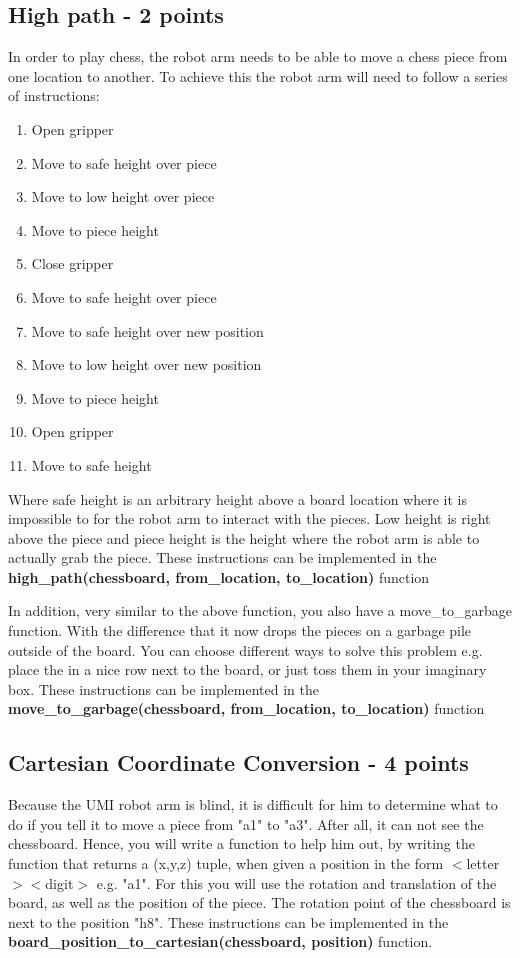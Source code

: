 \documentclass[10pt]{scrartcl}
\begin{document}
\subsection*{High path - 2 points}
In order to play chess, the robot arm needs to be able to move a chess piece from one location to another. To achieve this the robot arm will need to follow a series of instructions:
\begin{enumerate}
\item Open gripper
\item Move to safe height over piece
\item Move to low height over piece
\item Move to piece height
\item Close gripper
\item Move to safe height over piece
\item Move to safe height over new position
\item Move to low height over new position
\item Move to piece height
\item Open gripper
\item Move to safe height
\end{enumerate}
Where safe height is an arbitrary height above a board location where it is impossible to for the robot arm to interact with the pieces. Low height is right above the piece and piece height is the height where the robot arm is able to actually grab the piece. These instructions can be implemented in the \textbf{high\_path(chessboard, from\_location, to\_location)} function

In addition, very similar to the above function, you also have a move\_to\_garbage function. With the difference that it now drops the pieces on a garbage pile outside of the board. You can choose different ways to solve this problem e.g. place the in a nice row next to the board, or just toss them in your imaginary box. These instructions can be implemented in the \textbf{move\_to\_garbage(chessboard, from\_location, to\_location)} function

\subsection*{Cartesian Coordinate Conversion - 4 points}
Because the UMI robot arm is blind, it is difficult for him to determine what to do if you tell it to move a piece from "a1" to "a3". After all, it can not see the chessboard. Hence, you will write a function to help him out, by writing the function that returns a (x,y,z) tuple, when given a position in the form $<$letter$><$digit$>$ e.g. "a1". For this you will use the rotation and translation of the board, as well as the position of the piece. The rotation point of the chessboard is next to the position "h8". These instructions can be implemented in the \textbf{board\_position\_to\_cartesian(chessboard, position)} function.
\end{document}
